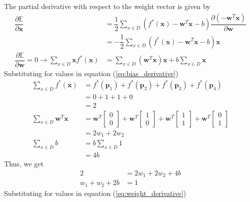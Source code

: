 The partial derivative with respect to the weight vector is given by
\begin{align}
  \nonumber
  \dfrac{\partial \mathbb{E}}{\partial \textbf{x}} &= \dfrac{1}{2} \sum_{x\in D}(f^{*}(\textbf{x})- \textbf{w}^T\textbf{x}-b) \dfrac{\partial (-\textbf{w}^T\textbf{x})}{\partial \textbf{w}}\\
  \nonumber
  &=-\dfrac{1}{2} \sum_{x\in D}(f^{*}(\textbf{x})- \textbf{w}^T\textbf{x}-b)\textbf{x}\\
  \label{eq:weight_derivative}
  \dfrac{\partial \mathbb{E}}{\partial \textbf{w}} = 0\rightarrow \sum_{x\in D}\textbf{x}f^{*}(\textbf{x}) &= \sum_{x\in D}(\textbf{w}^T\textbf{x})\textbf{x} + b\sum_{x\in D}\textbf{x}
\end{align}
Substituting for values in equation (\ref{eq:bias_derivative})
\begin{align}
  \sum_{x\in D}f^{*}(\textbf{x}) &= f^{*}(\textbf{p}_1) + f^{*}(\textbf{p}_2) + f^{*}(\textbf{p}_3) + f^{*}(\textbf{p}_4) \nonumber \\
  &= 0+1+1+0 \nonumber \\
  & = 2 \\
  \sum_{x\in D}\textbf{w}^T\textbf{x} &= \textbf{w}^T\begin{bmatrix}
    0 \\
    0
  \end{bmatrix} + \textbf{w}^T\begin{bmatrix}
    1 \\
    0
  \end{bmatrix} + \textbf{w}^T\begin{bmatrix}
    1 \\
    1
  \end{bmatrix}+ \textbf{w}^T\begin{bmatrix}
    0 \\
    1
  \end{bmatrix} \nonumber \\
  &= 2w_1 + 2w_2 \\
  \nonumber
  \sum_{x\in D}b &= b \sum_{x\in D} 1 \\&= 4b
\end{align}
Thus, we get
\begin{align}
\nonumber 2 &= 2w_1 + 2w_2 + 4b \\
w_1 + w_2 + 2b &= 1
\label{eq:first_set_normal_eq}
\end{align}
Substituting for values in equation (\ref{eq:weight_derivative})
